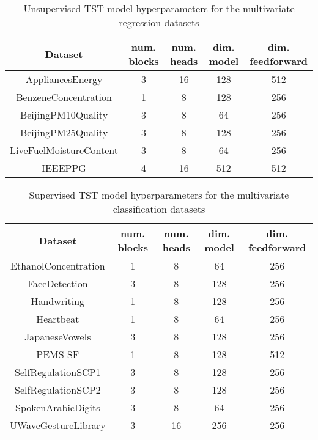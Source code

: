 \documentclass{article} \usepackage{iclr2021_conference,times}
\begin{document}
\begin{table}
\centering
\begin{tabular}{|c|c|c|c|c|} 
\hline
Dataset                 & num. blocks & num. heads & dim. model & dim. feedforward  \\ 
\hline
AppliancesEnergy        & 3           & 16         & 128        & 512               \\
BenzeneConcentration    & 1           & 8          & 128        & 256               \\
BeijingPM10Quality      & 3           & 8          & 64         & 256               \\
BeijingPM25Quality      & 3           & 8          & 128        & 256               \\
LiveFuelMoistureContent & 3           & 8          & 64         & 256               \\
IEEEPPG                 & 4           & 16         & 512        & 512               \\
\hline
\end{tabular}
\caption{Unsupervised TST model hyperparameters for the multivariate regression datasets}
\label{tab:hyperparams_unsupervised_regression_datasets}
\end{table}


\begin{table}
\centering
\begin{tabular}{|c|c|c|c|c|} 
\hline
Dataset              & num. blocks & num. heads & dim. model & dim. feedforward  \\ 
\hline
EthanolConcentration & 1           & 8          & 64         & 256               \\
FaceDetection        & 3           & 8          & 128        & 256               \\
Handwriting          & 1           & 8          & 128        & 256               \\
Heartbeat            & 1           & 8          & 64         & 256               \\
JapaneseVowels       & 3           & 8          & 128        & 256               \\
PEMS-SF              & 1           & 8          & 128        & 512               \\
SelfRegulationSCP1   & 3           & 8          & 128        & 256               \\
SelfRegulationSCP2   & 3           & 8          & 128        & 256               \\
SpokenArabicDigits   & 3           & 8          & 64         & 256               \\
UWaveGestureLibrary  & 3           & 16         & 256        & 256               \\
\hline
\end{tabular}
\caption{Supervised TST model hyperparameters for the multivariate classification datasets}
\label{tab:hyperparams_supervised_classification_datasets}
\end{table}
\end{document}
